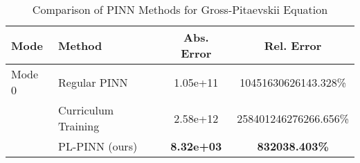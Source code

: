 \begin{table}[htbp]
\centering
\caption{Comparison of PINN Methods for Gross-Pitaevskii Equation}
\label{tab:pinn_comparison}
\begin{tabular}{llcc}
\toprule
Mode & Method & Abs. Error & Rel. Error \\
\midrule
Mode 0 & Regular PINN & 1.05e+11 & 10451630626143.328\% \\
 & Curriculum Training & 2.58e+12 & 258401246276266.656\% \\
 & PL-PINN (ours) & \textbf{8.32e+03} & \textbf{832038.403\%} \\
\bottomrule
\end{tabular}
\end{table}